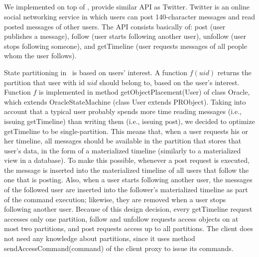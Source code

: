 

\subsection{\appname}

We implemented \appname{} on top of \libname{}, provide similar API as Twitter. Twitter is an online social networking service in which users can post 140-character messages and read posted messages of other users. The API consists basically of: post (user publishes a message), follow (user starts following another user), unfollow (user stops following someone), and getTimeline (user requests messages of all people whom the user follows).

State partitioning in \appname\ is based on users' interest. A function $f(uid)$ returns the partition that user with id $uid$ should belong to, based on the user's interest. Function $f$ is implemented in method getObjectPlacement(User) of class \appname{}Oracle, which extends OracleStateMachine (class User extends PRObject). Taking into account that a typical user probably spends more time reading messages (i.e., issuing getTimeline) than writing them (i.e., issuing post), we decided to optimize getTimeline to be single-partition. This means that, when a user requests his or her timeline, all messages should be available in the partition that stores that user's data, in the form of a materialized timeline (similarly to a materialized view in a database). To make this possible, whenever a post request is executed, the message is inserted into the materialized timeline of all users that follow the one that is posting. Also, when a user starts following another user, the messages of the followed user are inserted into the follower's materialized timeline as part of the command execution; likewise, they are removed when a user stops following another user. Because of this design decision, every getTimeline request accesses only one partition, follow and unfollow requests access objects on at most two partitions, and post requests access up to all partitions. The \appname{} client does not need any knowledge about partitions, since it uses method sendAccessCommand(command) of the \dssmr{} client proxy to issue its commands.

